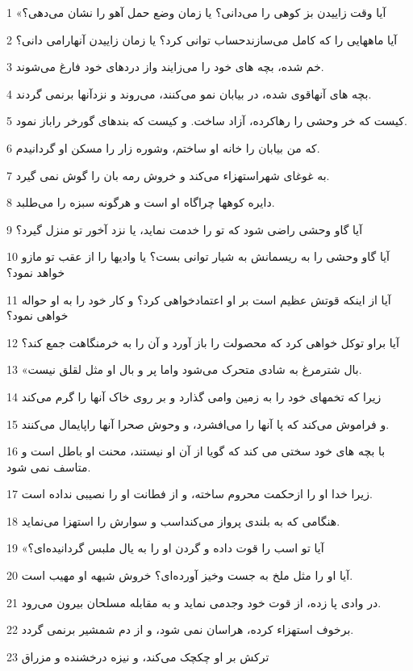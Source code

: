 \par 1 «آیا وقت زاییدن بز کوهی را می‌دانی؟ یا زمان وضع حمل آهو را نشان می‌دهی؟
\par 2 آیا ماههایی را که کامل می‌سازندحساب توانی کرد؟ یا زمان زاییدن آنهارامی دانی؟
\par 3 خم شده، بچه های خود را می‌زایند واز دردهای خود فارغ می‌شوند.
\par 4 بچه های آنهاقوی شده، در بیابان نمو می‌کنند، می‌روند و نزدآنها برنمی گردند.
\par 5 کیست که خر وحشی را رهاکرده، آزاد ساخت. و کیست که بندهای گورخر راباز نمود.
\par 6 که من بیابان را خانه او ساختم، وشوره زار را مسکن او گردانیدم.
\par 7 به غوغای شهراستهزاء می‌کند و خروش رمه بان را گوش نمی گیرد.
\par 8 دایره کوهها چراگاه او است و هرگونه سبزه را می‌طلبد.
\par 9 آیا گاو وحشی راضی شود که تو را خدمت نماید، یا نزد آخور تو منزل گیرد؟
\par 10 آیا گاو وحشی را به ریسمانش به شیار توانی بست؟ یا وادیها را از عقب تو مازو خواهد نمود؟
\par 11 آیا از اینکه قوتش عظیم است بر او اعتمادخواهی کرد؟ و کار خود را به او حواله خواهی نمود؟
\par 12 آیا براو توکل خواهی کرد که محصولت را باز آورد و آن را به خرمنگاهت جمع کند؟
\par 13 «بال شترمرغ به شادی متحرک می‌شود واما پر و بال او مثل لقلق نیست.
\par 14 زیرا که تخمهای خود را به زمین وامی گذارد و بر روی خاک آنها را گرم می‌کند
\par 15 و فراموش می‌کند که پا آنها را می‌افشرد، و وحوش صحرا آنها راپایمال می‌کنند.
\par 16 با بچه های خود سختی می کند که گویا از آن او نیستند، محنت او باطل است و متاسف نمی شود.
\par 17 زیرا خدا او را ازحکمت محروم ساخته، و از فطانت او را نصیبی نداده است.
\par 18 هنگامی که به بلندی پرواز می‌کنداسب و سوارش را استهزا می‌نماید.
\par 19 «آیا تو اسب را قوت داده و گردن او را به یال ملبس گردانیده‌ای؟
\par 20 آیا او را مثل ملخ به جست وخیز آورده‌ای؟ خروش شیهه او مهیب است.
\par 21 در وادی پا زده، از قوت خود وجدمی نماید و به مقابله مسلحان بیرون می‌رود.
\par 22 برخوف استهزاء کرده، هراسان نمی شود، و از دم شمشیر برنمی گردد.
\par 23 ترکش بر او چکچک می‌کند، و نیزه درخشنده و مزراق
